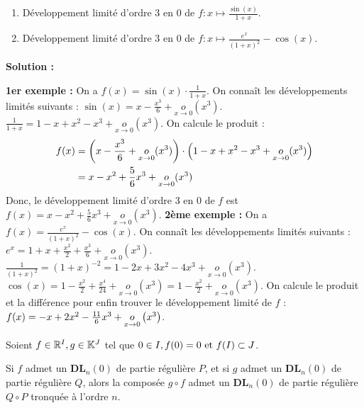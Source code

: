 \documentclass[12pt, a4paper]{report}
\begin{document}
\begin{example}
    \begin{enumerate}
        \item Développement limité d'ordre 3 en 0 de $f:x\mapsto \frac{\sin(x)}{1+x}$.
        \item Développement limité d'ordre 3 en 0 de $f:x\mapsto \frac{e^x}{(1+x)^2}-\cos(x)$.
    \end{enumerate}

    \textbf{Solution :}

    \begin{outline}
        \1 \textbf{1er exemple :}
        \2 On a $f(x)=\sin(x)\cdot \frac{1}{1+x}$.
        \2 On connaît les développements limités suivants :
        \3 $\sin(x) = x - \frac{x^3}{6} + \underset{x\to 0}{o}(x^3)$.
        \3 $\frac{1}{1+x} = 1 - x + x^2 - x^3 + \underset{x\to 0}{o}(x^3)$.
        \2 On calcule le produit :
        \2 \begin{align*}
            f(x) &= \left(x - \frac{x^3}{6} + \underset{x\to 0}{o}(x^3)\right) \cdot \left(1 - x + x^2 - x^3 + \underset{x\to 0}{o}(x^3)\right)\\
            &= x - x^2 + \frac{5}{6}x^3 + \underset{x\to 0}{o}(x^3)
        \end{align*}
        \2 Donc, le développement limité d'ordre 3 en 0 de $f$ est $f(x) = x - x^2 + \frac{5}{6}x^3 + \underset{x\to 0}{o}(x^3)$.
        \1 \textbf{2ème exemple :}
        \2 On a $f(x)=\frac{e^x}{(1+x)^2}-\cos(x)$.
        \2 On connaît les développements limités suivants :
        \3 $e^x = 1 + x + \frac{x^2}{2} + \frac{x^3}{6} + \underset{x\to 0}{o}(x^3)$.
        \3 $\frac{1}{(1+x)^2} = (1+x)^{-2} = 1 - 2x + 3x^2 - 4x^3 + \underset{x\to 0}{o}(x^3)$.
        \3 $\cos(x) = 1 - \frac{x^2}{2} + \frac{x^4}{24} + \underset{x\to 0}{o}(x^3) = 1 - \frac{x^2}{2} + \underset{x\to 0}{o}(x^3)$.
        \2 On calcule le produit et la différence pour enfin trouver le développement limité de $f$ :
        \2 $f(x)=-x+2x^2-\frac{11}6 x^3 + \underset{x\to0}{o}\left(x^3\right)$.
    \end{outline}
\end{example}


\begin{property}
    Soient $f \in \mathbb{R}^I, g \in \mathbb{K}^J$ tel que $0 \in I, f(0)=0 \text{ et } f(I) \subset J$.

    Si $f$ admet un $\mathbf{DL}_n(0)$ de partie régulière $P$, et si $g$ admet un $\mathbf{DL}_n(0)$ de partie régulière $Q$, alors la composée $g\circ f$ admet un $\mathbf{DL}_n(0)$ de partie régulière $Q\circ P$ tronquée à l'ordre $n$.
\end{property}
\end{document}

